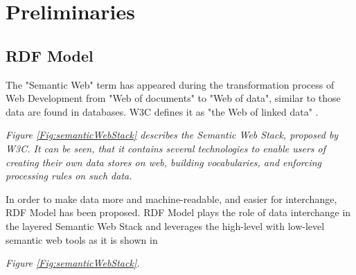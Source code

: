 \chapter{Preliminaries}
\label{ch:preliminaries}


\section{RDF Model}
The "Semantic Web" \cite{W3C:SemanticWebTerm:Online} term  has appeared during the transformation process of Web Development from "Web of documents" to "Web of data", similar to those data are found in databases. W3C defines it as "the Web of linked data" . {\it Figure \ref{Fig:semanticWebStack} describes the Semantic Web Stack, proposed by W3C. It can be seen, that it contains several technologies to enable users of creating their own data stores on web, building vocabularies, and enforcing processing rules on such data.   
\vspace{5mm} %
\par
In order to make data more and machine-readable, and easier for interchange, RDF Model \cite{W3C:RDF-Primer:Online} has been proposed. RDF Model plays the role of data interchange in the layered Semantic Web Stack and leverages the high-level with low-level semantic web tools as it is shown in {\it Figure \ref{Fig:semanticWebStack}. 

}}
